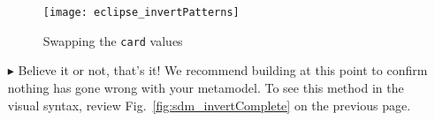 \begin{itemize}
\begin{figure}[htbp]
\begin{center}
  \texttt{[image: eclipse\_invertPatterns]}
  \caption{Swapping the \texttt{card} values}  
  \label{fig:invertPatterns}
\end{center}
\end{figure}

\item[$\blacktriangleright$] Believe it or not, that's it! We recommend building at this point to confirm nothing has gone wrong with your metamodel. To
see this method in the visual syntax, review Fig.~\ref{fig:sdm_invertComplete} on the previous page.

\end{itemize}
